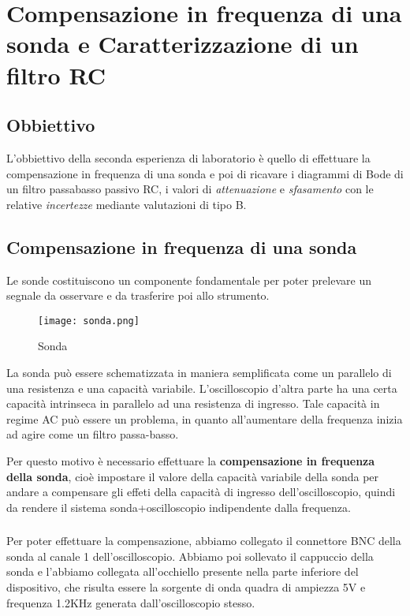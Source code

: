 \chapter{Compensazione in frequenza di una sonda  e Caratterizzazione di un filtro RC}
\label{chap:seconda_prova}
\section*{Obbiettivo}
L'obbiettivo della seconda esperienza di laboratorio è quello di effettuare la compensazione in frequenza di una sonda e poi di ricavare i diagrammi di Bode di un filtro passabasso passivo RC, i valori di \emph{attenuazione} e \emph{sfasamento} con le relative \emph{incertezze} mediante valutazioni di tipo B.

\section{Compensazione in frequenza di una sonda}
Le sonde costituiscono un componente fondamentale per poter prelevare un
segnale da osservare e da trasferire poi allo strumento.

\begin{figure}[h]
    \centering
    \texttt{[image: sonda.png]}
    \caption{Sonda}
    \label{fig:sonda}
\end{figure}

La sonda può essere schematizzata in maniera semplificata come un parallelo di una resistenza e una capacità variabile. L'oscilloscopio d'altra parte ha una certa capacità intrinseca in parallelo ad una resistenza di ingresso. Tale capacità in regime AC può essere un problema, in quanto all'aumentare della frequenza inizia ad agire come un filtro passa-basso.

Per questo motivo è necessario effettuare la \textbf{compensazione in frequenza della sonda}, cioè impostare il valore della capacità variabile della sonda per andare a compensare gli effeti della capacità di ingresso dell'oscilloscopio, quindi da rendere il sistema sonda+oscilloscopio indipendente dalla frequenza.

\subsection*{}
Per poter effettuare la compensazione, abbiamo collegato il connettore BNC della sonda al canale 1 dell'oscilloscopio. Abbiamo poi sollevato il cappuccio della sonda e l'abbiamo collegata all'occhiello presente nella parte inferiore del dispositivo, che risulta essere la sorgente di onda quadra di ampiezza 5V e frequenza 1.2KHz generata dall'oscilloscopio stesso.

